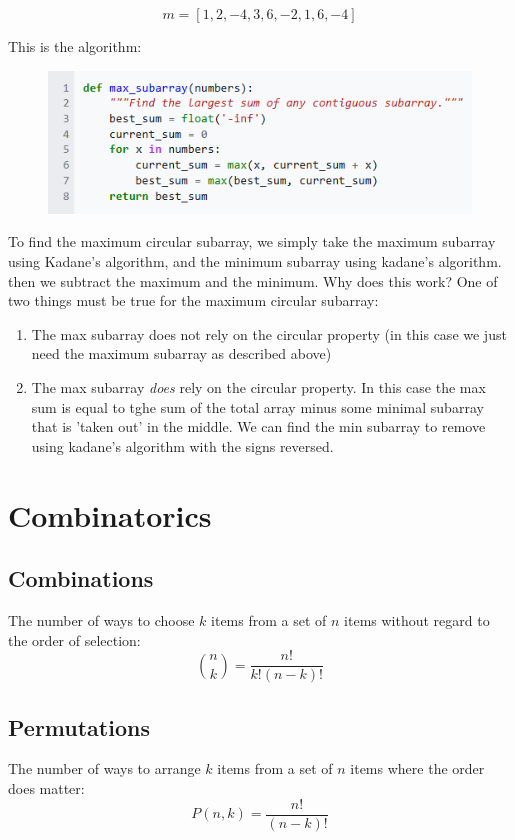 \documentclass[12pt]{article}
\begin{document}
\[m = [1, 2, -4, 3, 6, -2, 1, 6, -4]\]

This is the algorithm: 

\begin{figure}[H]
    \centering
    \includegraphics[width=1.0\textwidth]{./kadane.png} %
\end{figure}

To find the maximum circular subarray, we simply take the maximum subarray using Kadane's algorithm, and the minimum subarray using kadane's algorithm. then we subtract the maximum and the minimum. Why does this work? One of two things must be true for the maximum circular subarray:
\begin{enumerate}
\item The max subarray does not rely on the circular property (in this case we just need the maximum subarray as described above)
\item The max subarray \emph{does} rely on the circular property. In this case the max sum is equal to tghe sum of the total array minus some minimal subarray that is 'taken out' in the middle. We can find the min subarray to remove using kadane's algorithm with the signs reversed.
\end{enumerate}

\section{Combinatorics}
\subsection{Combinations}
The number of ways to choose \(k\) items from a set of \(n\) items without regard to the order of selection:
\[
\binom{n}{k} = \frac{n!}{k!(n-k)!}
\]

\subsection{Permutations}
The number of ways to arrange \(k\) items from a set of \(n\) items where the order does matter:
\[
P(n,k) = \frac{n!}{(n-k)!}
\]
\end{document}
